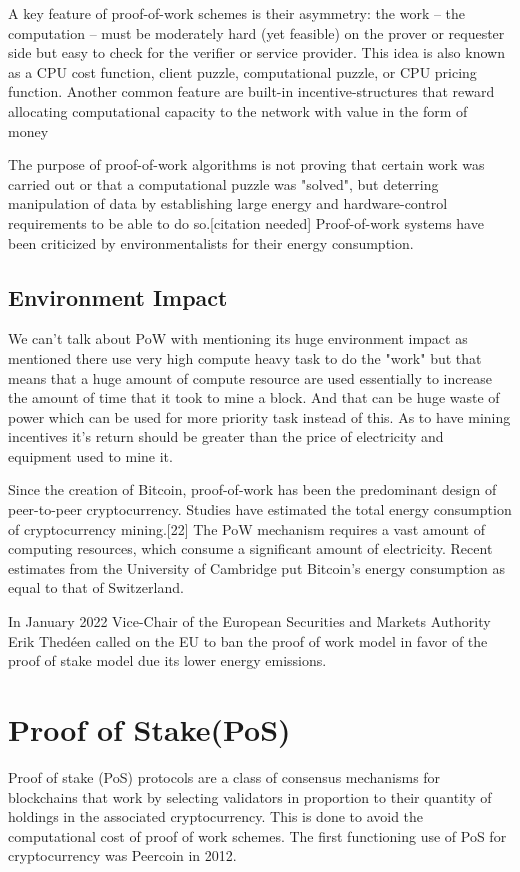 \documentclass[BTech]{srmuthesis}
\begin{document}
 A key feature of proof-of-work schemes is their asymmetry: the work – the computation – must be moderately hard (yet feasible) on the prover or requester side but easy to check for the verifier or service provider. This idea is also known as a CPU cost function, client puzzle, computational puzzle, or CPU pricing function. Another common feature are built-in incentive-structures that reward allocating computational capacity to the network with value in the form of money

 The purpose of proof-of-work algorithms is not proving that certain work was carried out or that a computational puzzle was "solved", but deterring manipulation of data by establishing large energy and hardware-control requirements to be able to do so.[citation needed] Proof-of-work systems have been criticized by environmentalists for their energy consumption.
 \subsection{Environment Impact}
 We can't talk about PoW with mentioning its huge environment impact as mentioned there use very high compute heavy task to do the "work" but that means that a huge amount of compute resource are used essentially to increase the amount of time that it took to mine a block. And that can be huge waste of power which can be used for more priority task instead of this. As to have mining incentives it's return should be greater than the price of electricity and equipment used to mine it.

 Since the creation of Bitcoin, proof-of-work has been the predominant design of peer-to-peer cryptocurrency. Studies have estimated the total energy consumption of cryptocurrency mining.[22] The PoW mechanism requires a vast amount of computing resources, which consume a significant amount of electricity. Recent estimates from the University of Cambridge put Bitcoin’s energy consumption as equal to that of Switzerland.

 In January 2022 Vice-Chair of the European Securities and Markets Authority Erik Thedéen called on the EU to ban the proof of work model in favor of the proof of stake model due its lower energy emissions. \citet{banpow}
 \section{Proof of Stake(PoS)}
 Proof of stake (PoS) \citet{survCos} protocols are a class of consensus mechanisms for blockchains that work by selecting validators in proportion to their quantity of holdings in the associated cryptocurrency. This is done to avoid the computational cost of proof of work schemes. The first functioning use of PoS for cryptocurrency was Peercoin in 2012.
\end{document}
